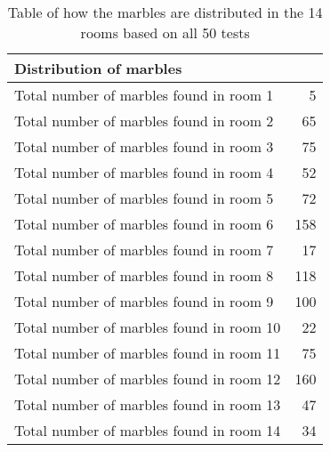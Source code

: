 \documentclass[../Head/Main.tex]{subfiles}
\begin{document}
\begin{table}[H]
	\centering
	\begin{tabular}{l r}
		\hline
		\multicolumn{2}{l}{\textbf{Distribution of marbles}}  			\\ \hline
		Total number of marbles found in room 1  & 5\\
		Total number of marbles found in room 2  & 65\\
		Total number of marbles found in room 3  & 75\\
		Total number of marbles found in room 4  & 52\\
		Total number of marbles found in room 5  & 72\\
		Total number of marbles found in room 6  & 158\\
		Total number of marbles found in room 7  & 17\\
		Total number of marbles found in room 8  & 118\\
		Total number of marbles found in room 9  & 100\\
		Total number of marbles found in room 10 & 22\\
		Total number of marbles found in room 11 & 75\\
		Total number of marbles found in room 12 & 160\\
		Total number of marbles found in room 13 & 47\\
		Total number of marbles found in room 14 & 34\\			\hline
	\end{tabular}
	\caption{Table of how the marbles are distributed in the 14 rooms based on all 50 tests}
	\label{tab:probability_raw_data}
\end{table}
\end{document}
